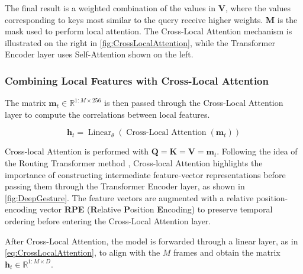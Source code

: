 The final result is a weighted combination of the values in \( \mathbf{V} \), where the values corresponding to keys most similar to the query receive higher weights. $\mathbf{M}$ is the mask used to perform local attention. The Cross-Local Attention mechanism is illustrated on the right in \autoref{fig:CrossLocalAttention}, while the Transformer Encoder layer uses Self-Attention shown on the left.

\subsubsection{Combining Local Features with Cross-Local Attention}


The matrix $\mathbf{m}_{t} \in \mathbb{R}^{1:M \times 256}$ is then passed through the Cross-Local Attention layer to compute the correlations between local features.


\begin{equation}
	\mathbf{h}_{t}  = \operatorname{Linear}_{\theta}  ( \operatorname{Cross-Local\ Attention}( \mathbf{m}_{t}) )
	\label{eq:CrossLocalAttention}
\end{equation}


Cross-local Attention is performed with $\mathbf{Q} = \mathbf{K} = \mathbf{V} = \mathbf{m}_{t}$.
Following the idea of the Routing Transformer method \cite{roy2021efficient}, Cross-local Attention highlights the importance of constructing intermediate feature-vector representations before passing them through the Transformer Encoder layer, as shown in \autoref{fig:DeepGesture}.
The feature vectors are augmented with a relative position-encoding vector \textbf{RPE} (\textbf{R}elative \textbf{P}osition \textbf{E}ncoding) to preserve temporal ordering before entering the Cross-Local Attention layer.

After Cross-Local Attention, the model is forwarded through a linear layer, as in \autoref{eq:CrossLocalAttention}, to align with the $M$ frames and obtain the matrix $\mathbf{h}_t \in \mathbb{R}^{1:M \times D}$.

